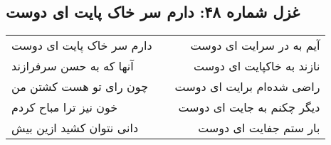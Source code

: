 \begin{center}
\section*{غزل شماره ۴۸: دارم سر خاک پایت ای دوست}
\label{sec:048}
\begin{longtable}{l p{0.5cm} r}
دارم سر خاک پایت ای دوست
&&
آیم به در سرایت ای دوست
\\
آنها که به حسن سرفرازند
&&
نازند به خاکپایت ای دوست
\\
چون رای تو هست کشتن من
&&
راضی شده‌ام برایت ای دوست
\\
خون نیز ترا مباح کردم
&&
دیگر چکنم به جایت ای دوست
\\
دانی نتوان کشید ازین بیش
&&
بار ستم جفایت ای دوست
\\
\end{longtable}
\end{center}
